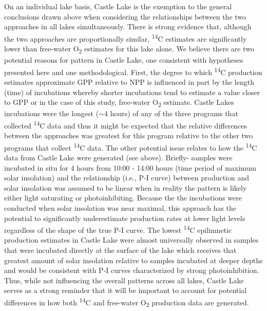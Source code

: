 \documentclass[12pt, oneside]{article}
\begin{document}
On an individual lake basis, Castle Lake is the exemption to the general conclusions drawn above when considering the relationships between the two approaches in all lakes simultaneously. There is strong evidence that, although the two approaches are proportionally similar, \textsuperscript{14}C estimates are significantly lower than free-water O\textsubscript{2} estimates for this lake alone. We believe there are two potential reasons for pattern in Castle Lake, one consistent with hypotheses presented here and one methodological. First, the degree to which \textsuperscript{14}C production estimates approximate GPP relative to NPP is influenced in part by the length (time) of incubations \citep{hall_measuring_2007} whereby shorter incubations tend to estimate a value closer to GPP or in the case of this study, free-water O\textsubscript{2} estimate. Castle Lakes incubations were the longest ($\sim$4 hours) of any of the three programs that collected \textsuperscript{14}C data and thus it might be expected that the relative differences between the approaches was greatest for this program relative to the other two programs that collect \textsuperscript{14}C data. The other potential issue relates to how the \textsuperscript{14}C data from Castle Lake were generated (see above). Briefly- samples were incubated in situ for 4 hours from 10:00 - 14:00 hours (time period of maximum solar insolation) and the relationship (i.e., P-I curve) between production and solar insolation was assumed to be linear when in reality the pattern is likely either light saturating or photoinhibiting. Because the the incubations were conducted when solar insolation was near maximal, this approach has the potential to significantly underestimate production rates at lower light levels regardless of the shape of the true P-I curve. The lowest \textsuperscript{14}C epilimnetic production estimates in Castle Lake were almost universally observed in samples that were incubated directly at the surface of the lake which receives that greatest amount of solar insolation relative to samples incubated at deeper depths and would be consistent with P-I curves characterized by strong photoinhibition. Thus, while not influencing the overall patterns across all lakes, Castle Lake serves as a strong reminder that it will be important to account for potential differences in how both \textsuperscript{14}C and free-water O\textsubscript{2} production data are generated.
\end{document}
